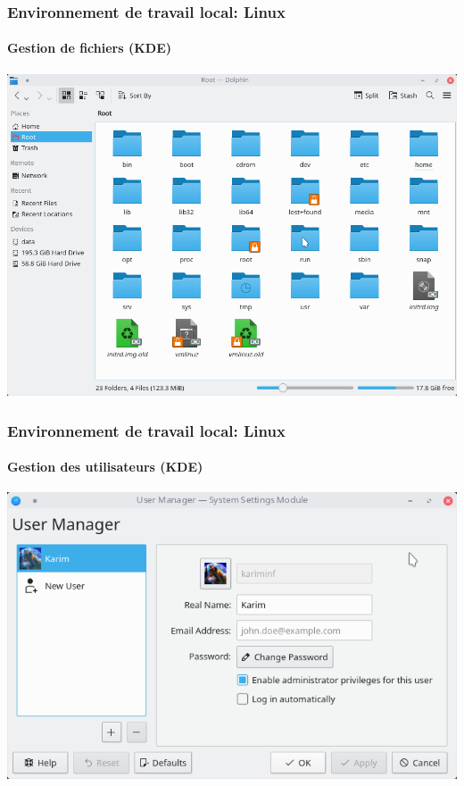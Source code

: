 \documentclass{beamer}
\begin{document}
\begin{frame}
\frametitle{Environnement de travail local: Linux}
\framesubtitle{Gestion de fichiers (KDE)}

\begin{center}
\includegraphics[height=
.8\textheight]{../img/Bweb01-environnement/kde-files.png}
\end{center}

\end{frame}

\begin{frame}
\frametitle{Environnement de travail local: Linux}
\framesubtitle{Gestion des utilisateurs (KDE)}

\begin{center}
\includegraphics[height=
.8\textheight]{../img/Bweb01-environnement/kde-users.png}
\end{center}

\end{frame}
\end{document}
